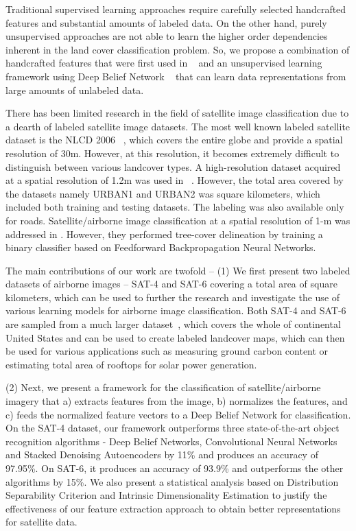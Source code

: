 \documentclass[11pt,a4paper]{article}
\begin{document}
Traditional supervised learning approaches require carefully selected handcrafted features and substantial amounts of labeled data. On the other hand, purely unsupervised approaches are not able to learn the higher order dependencies inherent in the land cover classification problem. So, we propose a combination of handcrafted features that were first used in ~\cite{haralick1973} and an unsupervised learning framework using Deep Belief Network ~\cite{Hinton06afast} that can learn data representations from large amounts of unlabeled data.

There has been limited research in the field of satellite image classification due to a dearth of labeled satellite image datasets. The most well known labeled satellite dataset is the NLCD 2006 ~\cite{wickham2013}, which covers the entire globe and provide a spatial resolution of 30m. However, at this resolution, it becomes extremely difficult to distinguish between various landcover types. A high-resolution dataset acquired at a spatial resolution of 1.2m was used in ~\cite{MnihHinton2010}. However, the total area covered by the datasets namely URBAN1 and URBAN2 was  square kilometers, which included both training and testing datasets. The labeling was also available only for roads. Satellite/airborne image classification at a spatial resolution of 1-m was addressed in \cite{basu2015}. However, they performed tree-cover delineation by training a binary classifier based on Feedforward Backpropagation Neural Networks. 

The main contributions of our work are twofold -- (1) We first present two labeled datasets of airborne images -- SAT-4 and SAT-6 covering a total area of  square kilometers, which can be used to further the research and investigate the use of various learning models for airborne image classification. Both SAT-4 and SAT-6 are sampled from a much larger dataset~\cite{naip}, which covers the whole of continental United States and can be used to create labeled landcover maps, which can then be used for various applications such as measuring ground carbon content or estimating total area of rooftops for solar power generation. 

(2) Next, we present a framework for the classification of satellite/airborne imagery that a) extracts features from the image, b) normalizes the features, and c) feeds the normalized feature vectors to a Deep Belief Network for classification. On the SAT-4 dataset, our framework outperforms three state-of-the-art object recognition algorithms - Deep Belief Networks, Convolutional Neural Networks and Stacked Denoising Autoencoders by 11\% and produces an accuracy of 97.95\%. On SAT-6, it produces an accuracy of 93.9\% and outperforms the other algorithms by 15\%. We also present a statistical analysis based on Distribution Separability Criterion and Intrinsic Dimensionality Estimation to justify the effectiveness of our feature extraction approach to obtain better representations for satellite data.      
\end{document}
